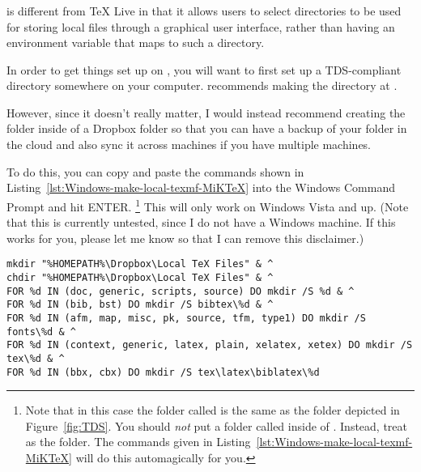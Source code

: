 \subsubsection{}
\label{subsubsec:local-files:miktex}

 is different from TeX Live in that it allows users to select directories to be used for storing local files through a graphical user interface, rather than having an environment variable that maps to such a directory.

In order to get things set up on , you will want to first set up a TDS-compliant directory somewhere on your computer.
 recommends making the directory at .

However, since it doesn't really matter, I would instead recommend creating the  folder inside of a Dropbox folder so that you can have a backup of your  folder in the cloud and also sync it across machines if you have multiple machines.

To do this, you can copy and paste the commands shown in Listing~\ref{lst:Windows-make-local-texmf-MiKTeX} into the Windows Command Prompt and hit ENTER.%
\footnote{%
Note that in this case the folder called  is the same as the  folder depicted in Figure~\ref{fig:TDS}.
You should \emph{not} put a folder called  inside of .
Instead, treat  as the  folder.
The commands given in Listing~\ref{lst:Windows-make-local-texmf-MiKTeX} will do this automagically for you.%
}
This will only work on Windows Vista and up.
(Note that this is currently untested, since I do not have a Windows machine.
If this works for you, please let me know so that I can remove this disclaimer.)

\begin{listing}[htbp]
	\centering
	\begin{verbatim}
mkdir "%HOMEPATH%\Dropbox\Local TeX Files" & ^
chdir "%HOMEPATH%\Dropbox\Local TeX Files" & ^
FOR %d IN (doc, generic, scripts, source) DO mkdir /S %d & ^
FOR %d IN (bib, bst) DO mkdir /S bibtex\%d & ^
FOR %d IN (afm, map, misc, pk, source, tfm, type1) DO mkdir /S fonts\%d & ^
FOR %d IN (context, generic, latex, plain, xelatex, xetex) DO mkdir /S tex\%d & ^
FOR %d IN (bbx, cbx) DO mkdir /S tex\latex\biblatex\%d
	\end{verbatim}
	\caption{Make a TDS-compliant directory in Dropbox for  on Windows}
	\label{lst:Windows-make-local-texmf-MiKTeX}
\end{listing}

